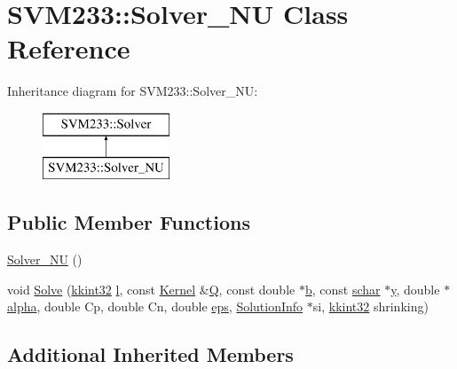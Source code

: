 \hypertarget{class_s_v_m233_1_1_solver___n_u}{}\section{S\+V\+M233\+:\+:Solver\+\_\+\+NU Class Reference}
\label{class_s_v_m233_1_1_solver___n_u}
Inheritance diagram for S\+V\+M233\+:\+:Solver\+\_\+\+NU\+:\begin{figure}[H]
\begin{center}
\leavevmode
\includegraphics[height=2.000000cm]{class_s_v_m233_1_1_solver___n_u}
\end{center}
\end{figure}
\subsection*{Public Member Functions}
\begin{DoxyCompactItemize}
\item 
\hyperlink{class_s_v_m233_1_1_solver___n_u_a29ed687d32277c7151575a2543365b12}{Solver\+\_\+\+NU} ()
\item 
void \hyperlink{class_s_v_m233_1_1_solver___n_u_a4739c60c6df2c7fdc3213e6a8be5ddb3}{Solve} (\hyperlink{namespace_k_k_b_a8fa4952cc84fda1de4bec1fbdd8d5b1b}{kkint32} \hyperlink{class_s_v_m233_1_1_solver_a258ab441755a415c6b1f0b19f55f36fc}{l}, const \hyperlink{class_s_v_m233_1_1_kernel}{Kernel} \&\hyperlink{class_s_v_m233_1_1_solver_a09e21006f46841e5c9c6f97b87995743}{Q}, const double $\ast$\hyperlink{class_s_v_m233_1_1_solver_ae7665148726947abe81ad6e54fdfca14}{b}, const \hyperlink{namespace_s_v_m233_afb4ec48497a25626275d52266ac9d7d8}{schar} $\ast$\hyperlink{class_s_v_m233_1_1_solver_a17e4f05ccc46afc5b9bf686eac10928d}{y}, double $\ast$\hyperlink{class_s_v_m233_1_1_solver_ade1450d3dbc0633ad00958cf2b78eb0b}{alpha}, double Cp, double Cn, double \hyperlink{class_s_v_m233_1_1_solver_a5332bb5b52696238e1a9e784e187a901}{eps}, \hyperlink{struct_s_v_m233_1_1_solver_1_1_solution_info}{Solution\+Info} $\ast$si, \hyperlink{namespace_k_k_b_a8fa4952cc84fda1de4bec1fbdd8d5b1b}{kkint32} shrinking)
\end{DoxyCompactItemize}
\subsection*{Additional Inherited Members}


